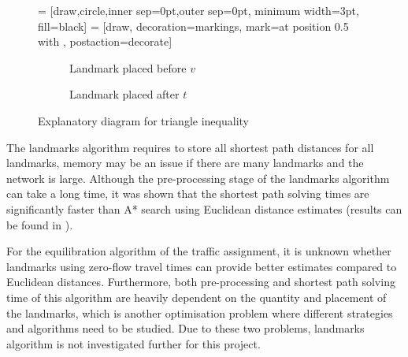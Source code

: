 \begin{figure}[!ht]
    \centering
     = [draw,circle,inner sep=0pt,outer sep=0pt, minimum width=3pt, fill=black]
     = [draw, decoration={markings, mark=at position 0.5 with {\arrow{>}}}, postaction={decorate}]
    \begin{subfigure}[t]{.4\textwidth}
        \centering
        \caption{Landmark placed before $v$}
    \end{subfigure}
    \hspace{1cm}
    \begin{subfigure}[t]{.4\textwidth}
        \centering
        \caption{Landmark placed after $t$}
    \end{subfigure}
    \caption{Explanatory diagram for triangle inequality}
    \label{fig:landmarks}
\end{figure}

The landmarks algorithm requires to store all shortest path distances for all landmarks, memory may be an issue if there are many landmarks and the network is large.
Although the pre-processing stage of the landmarks algorithm can take a long time,
it was shown that the shortest path solving times are significantly faster than A* search using Euclidean distance estimates (results can be found in \citet{GoldbergLandmarks}).

For the equilibration algorithm of the traffic assignment,
it is unknown whether landmarks using zero-flow travel times can provide better estimates compared to Euclidean distances.
Furthermore, both pre-processing and shortest path solving time of this algorithm are heavily dependent on the quantity and placement of the landmarks,
which is another optimisation problem where different strategies and algorithms need to be studied.
Due to these two problems, landmarks algorithm is not investigated further for this project.
